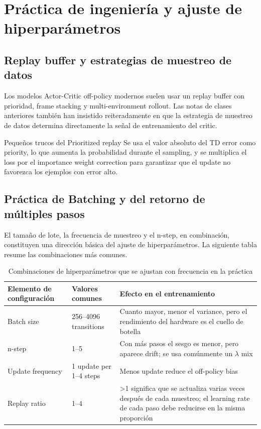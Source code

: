 \section{Práctica de ingeniería y ajuste de hiperparámetros}

\subsection{Replay buffer y estrategias de muestreo de datos}

Los modelos Actor-Critic off-policy modernos suelen usar un replay buffer con prioridad, frame stacking y multi-environment rollout. Las notas de clases anteriores también han insistido reiteradamente en que la estrategia de muestreo de datos determina directamente la señal de entrenamiento del critic.

\begin{knowledgebox}{Pequeños trucos del Prioritized replay}
Se usa el valor absoluto del TD error como priority, lo que aumenta la probabilidad durante el sampling, y se multiplica el loss por el importance weight correction para garantizar que el update no favorezca los ejemplos con error alto.
\end{knowledgebox}

\subsection{Práctica de Batching y del retorno de múltiples pasos}

El tamaño de lote, la frecuencia de muestreo y el n-step, en combinación, constituyen una dirección básica del ajuste de hiperparámetros. La siguiente tabla resume las combinaciones más comunes.

\begin{table}[H]
\centering
\begin{tabular}{p{}p{}p{}}
\toprule
Elemento de configuración & Valores comunes & Efecto en el entrenamiento \\
\midrule
Batch size & 256--4096 transitions & Cuanto mayor, menor el variance, pero el rendimiento del hardware es el cuello de botella \\
n-step & 1--5 & Con más pasos el sesgo es menor, pero aparece drift; se usa comúnmente un $\lambda$ mix \\
Update frequency & 1 update per 1--4 steps & Menos update reduce el off-policy bias \\
Replay ratio & 1--4 & >1 significa que se actualiza varias veces después de cada muestreo; el learning rate de cada paso debe reducirse en la misma proporción \\
\bottomrule
\end{tabular}
\caption{Combinaciones de hiperparámetros que se ajustan con frecuencia en la práctica}
\end{table}

